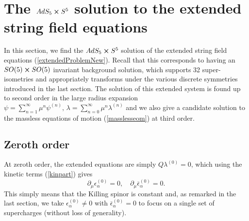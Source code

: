 \documentclass[12pt]{article}
\def\be{\begin{equation}}
\def\ee{\end{equation}}
\numberwithin{equation}{section}
\begin{document}
\section{The $AdS_5 \cross S^5$ solution to the extended string field equations}
\label{solext}
In this section, we find the $AdS_5 \cross S^5$ solution of the extended string field equations (\ref{extendedProblemNew}). Recall that this corresponds to having an $SO(5) \cross SO(5)$ invariant background solution, which supports 32 super-isometries and appropriately transforms under the various discrete symmetries introduced in the last section. The solution of this extended system is found up to second order in the large radius expansion $\psi = \sum_{n=1}^\infty \mu^n \psi^{(n)}, \, \lambda = \sum_{n=0}^\infty \mu^n \lambda^{(n)}$ and we also give a candidate solution to the massless equations of motion (\ref{masslesseom}) at third order.

\subsection{Zeroth order}
At zeroth order, the extended equations are simply $Q \lambda^{(0)} = 0$, which using the kinetic terms (\ref{kinpart}) gives
\be
\partial_\mu \epsilon^{(0)}_\alpha = 0, \quad \partial_\mu \bar{\epsilon}^{(0)}_\alpha = 0.
\ee
This simply means that the Killing spinor is constant and, as remarked in the last section, we take $\epsilon^{(0)}_\alpha \neq 0$ with $\bar{\epsilon}^{(0)}_\alpha = 0$ to focus on a single set of supercharges (without loss of generality).
\end{document}

